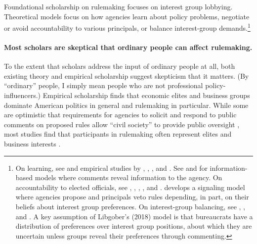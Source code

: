 \documentclass[
      12pt,
        ]{article}
\begin{document}
Foundational scholarship on rulemaking \citep[\citet{Furlong1997}, \citet{Furlong1998}, \citet{Kerwin2011}]{Furlong2005} focuses on interest group lobbying. Theoretical models focus on how agencies learn about policy problems, negotiate or avoid accountability to various principals, or balance interest-group demands.\footnote{On learning, see \citet{Kerwin2011} and empirical studies by \citet{Yackee2012},
  \citet{Cook2017}, \citet{Gordon2018}, and \citet{Walters2019}. See \citet{Gailmard2017} and
  \citet{Libgober2018} for information-based models where comments reveal information to the agency.
  On accountability to elected officials, see \citet{Furlong1997}, \citet{Nou2016},
  \citet{Potter2016}, \citet{Woods2018}, and \citet{Yackee2009RegGov}.
  \citet{Potter2014dis} develops a signaling model where agencies propose and principals veto rules depending, in part, on their beliefs about interest group preferences.
  On interest-group balancing, see \citet{Yackee2006JOP}, \citet{Yackee2006JPART},
  and \citet{Kerwin2011}. A key assumption of Libgober's (2018) model is that
  bureaucrats have a distribution of preferences over interest group
  positions, about which they are uncertain unless groups reveal their
  preferences through commenting.}

\hypertarget{most-scholars-are-skeptical-that-ordinary-people-can-affect-rulemaking.}{%
\paragraph{Most scholars are skeptical that ordinary people can affect rulemaking.}\label{most-scholars-are-skeptical-that-ordinary-people-can-affect-rulemaking.}}

To the extent that scholars address the input of ordinary people at all, both
existing theory and empirical scholarship suggest skepticism that it
matters. (By ``ordinary'' people, I simply mean people who are not
professional policy-influencers.)
Empirical scholarship finds that economic elites and business groups
dominate American politics in general \citep[\citet{Soss2007}, Hertel-Fernandez2019, \citet{Hacker2003}, \citet{Gilens2014}]{Jacobs2005} and rulemaking in
particular. While some are optimistic that requirements for agencies to
solicit and respond to public comments on proposed rules allow ``civil
society'' to provide public oversight \citep{Michaels2015, Metzger2010}, most
studies find that participants in rulemaking often represent elites and
business interests \citep[LibgoberCarpenter2018]{Seifter2016UCLA, Crow2015, Wagner2011, West2009, Yackee2006JOP, Yackee2006JPART, Golden1998, Haeder2015, Cook2017}.
\end{document}
